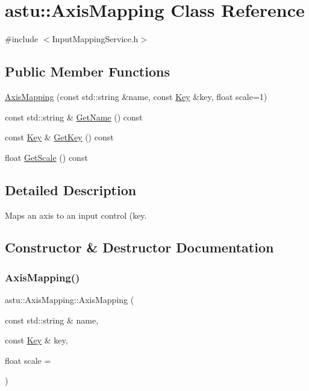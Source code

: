 \hypertarget{classastu_1_1AxisMapping}{}\section{astu\+:\+:Axis\+Mapping Class Reference}
\label{classastu_1_1AxisMapping}


{\ttfamily \#include $<$Input\+Mapping\+Service.\+h$>$}

\subsection*{Public Member Functions}
\begin{DoxyCompactItemize}
\item 
\hyperlink{classastu_1_1AxisMapping_a1145f8432af7cea0bc9db96735386d9f}{Axis\+Mapping} (const std\+::string \&name, const \hyperlink{classastu_1_1Key}{Key} \&key, float scale=1)
\item 
const std\+::string \& \hyperlink{classastu_1_1AxisMapping_a6f58533973272cb6f826960810c70600}{Get\+Name} () const
\item 
const \hyperlink{classastu_1_1Key}{Key} \& \hyperlink{classastu_1_1AxisMapping_ac6168d999aca7d2f7e4b71d29e6de12d}{Get\+Key} () const
\item 
float \hyperlink{classastu_1_1AxisMapping_ad06f6315529e72132e27c97b6ff15378}{Get\+Scale} () const
\end{DoxyCompactItemize}


\subsection{Detailed Description}
Maps an axis to an input control (key. 

\subsection{Constructor \& Destructor Documentation}
\mbox{\label{classastu_1_1AxisMapping_a1145f8432af7cea0bc9db96735386d9f}} 
\subsubsection{\texorpdfstring{Axis\+Mapping()}{AxisMapping()}}
{\footnotesize\ttfamily astu\+::\+Axis\+Mapping\+::\+Axis\+Mapping (\begin{DoxyParamCaption}\item[{const std\+::string \&}]{name,  }\item[{const \hyperlink{classastu_1_1Key}{Key} \&}]{key,  }\item[{float}]{scale = {} }\end{DoxyParamCaption})}

